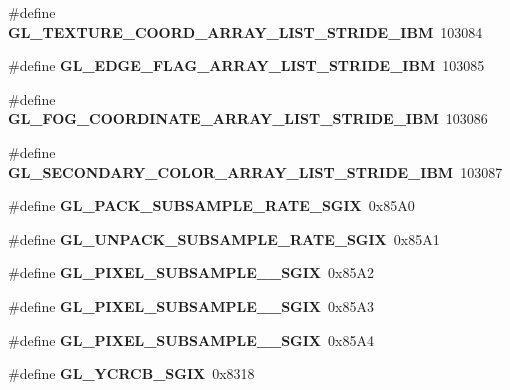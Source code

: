 \begin{DoxyCompactItemize}
\item 
\#define {\bfseries G\+L\+\_\+\+T\+E\+X\+T\+U\+R\+E\+\_\+\+C\+O\+O\+R\+D\+\_\+\+A\+R\+R\+A\+Y\+\_\+\+L\+I\+S\+T\+\_\+\+S\+T\+R\+I\+D\+E\+\_\+\+I\+B\+M}~103084\label{_s_d_l__opengl_8h_a7fa38c4c303ca929d72b40ff7ae38fea}

\item 
\#define {\bfseries G\+L\+\_\+\+E\+D\+G\+E\+\_\+\+F\+L\+A\+G\+\_\+\+A\+R\+R\+A\+Y\+\_\+\+L\+I\+S\+T\+\_\+\+S\+T\+R\+I\+D\+E\+\_\+\+I\+B\+M}~103085\label{_s_d_l__opengl_8h_af9ffd6f6619081acae2aad3104aeb41a}

\item 
\#define {\bfseries G\+L\+\_\+\+F\+O\+G\+\_\+\+C\+O\+O\+R\+D\+I\+N\+A\+T\+E\+\_\+\+A\+R\+R\+A\+Y\+\_\+\+L\+I\+S\+T\+\_\+\+S\+T\+R\+I\+D\+E\+\_\+\+I\+B\+M}~103086\label{_s_d_l__opengl_8h_a7f44ae93fd6b5f2025ef2d92799b1a3b}

\item 
\#define {\bfseries G\+L\+\_\+\+S\+E\+C\+O\+N\+D\+A\+R\+Y\+\_\+\+C\+O\+L\+O\+R\+\_\+\+A\+R\+R\+A\+Y\+\_\+\+L\+I\+S\+T\+\_\+\+S\+T\+R\+I\+D\+E\+\_\+\+I\+B\+M}~103087\label{_s_d_l__opengl_8h_a21e95f456b44c876c8747d0b8aa6b876}

\item 
\#define {\bfseries G\+L\+\_\+\+P\+A\+C\+K\+\_\+\+S\+U\+B\+S\+A\+M\+P\+L\+E\+\_\+\+R\+A\+T\+E\+\_\+\+S\+G\+I\+X}~0x85\+A0\label{_s_d_l__opengl_8h_ab9b31ba3e90ee0170807e1c6a0fe4794}

\item 
\#define {\bfseries G\+L\+\_\+\+U\+N\+P\+A\+C\+K\+\_\+\+S\+U\+B\+S\+A\+M\+P\+L\+E\+\_\+\+R\+A\+T\+E\+\_\+\+S\+G\+I\+X}~0x85\+A1\label{_s_d_l__opengl_8h_a13ddaf68b514f13f3d8944faa06a2f08}

\item 
\#define {\bfseries G\+L\+\_\+\+P\+I\+X\+E\+L\+\_\+\+S\+U\+B\+S\+A\+M\+P\+L\+E\+\_\+\_\+\+S\+G\+I\+X}~0x85\+A2\label{_s_d_l__opengl_8h_aacb2ebe7c1e9760f7cf131c823b56c97}

\item 
\#define {\bfseries G\+L\+\_\+\+P\+I\+X\+E\+L\+\_\+\+S\+U\+B\+S\+A\+M\+P\+L\+E\+\_\+\_\+\+S\+G\+I\+X}~0x85\+A3\label{_s_d_l__opengl_8h_af27edba1fa57cea900c5d3b24227418f}

\item 
\#define {\bfseries G\+L\+\_\+\+P\+I\+X\+E\+L\+\_\+\+S\+U\+B\+S\+A\+M\+P\+L\+E\+\_\+\_\+\+S\+G\+I\+X}~0x85\+A4\label{_s_d_l__opengl_8h_adb5e7feb552687419bb0df525557b655}

\item 
\#define {\bfseries G\+L\+\_\+\+Y\+C\+R\+C\+B\+\_\+\+S\+G\+I\+X}~0x8318\label{_s_d_l__opengl_8h_ae8a2ad5a5b7d0ea38cf406dd49ca199d}


\end{DoxyCompactItemize}
